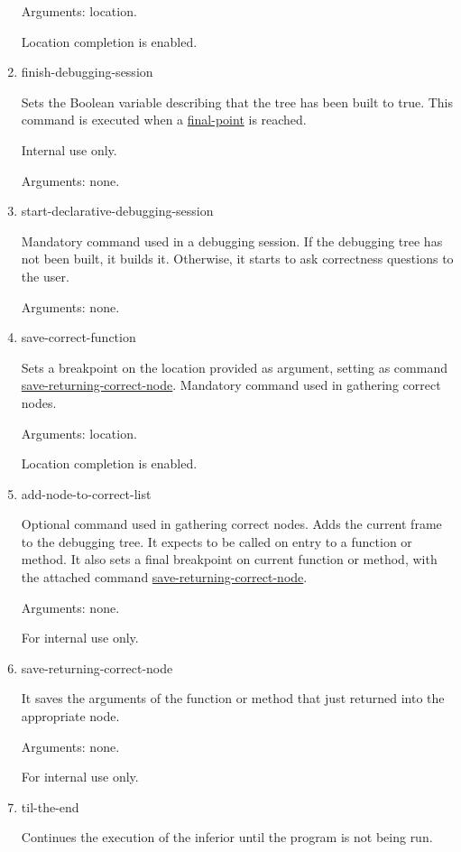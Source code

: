 \begin{enumerate}
Arguments: location.

Location completion is enabled.
\item finish-debugging-session
\label{command:finish-debugging-session}

Sets the Boolean variable describing that the tree has been built to true.
This command is executed when a \hyperref[command:final-point]{final-point} is reached.

Internal use only.

Arguments: none.
\item start-declarative-debugging-session
\label{command:start-declarative-debugging-session}

Mandatory command used in a debugging session.
If the debugging tree has not been built, it builds it. Otherwise, it starts to ask correctness questions to the user.

Arguments: none.
\item save-correct-function
\label{command:save-correct-function}

Sets a breakpoint on the location provided as argument, setting as command \hyperref[command:save-returning-correct-node]{save-returning-correct-node}. Mandatory command used in gathering correct nodes.

Arguments: location.

Location completion is enabled.
\item add-node-to-correct-list
\label{command:add-node-to-correct-list}

Optional command used in gathering correct nodes.
Adds the current frame to the debugging tree.
It expects to be called on entry to a function or method.
It also sets a final breakpoint on current function or method, with the attached command \hyperref[command:save-returning-correct-node]{save-returning-correct-node}.

Arguments: none.

For internal use only.
\item save-returning-correct-node
\label{command:save-returning-correct-node}

It saves the arguments of the function or method that just returned into the appropriate node.

Arguments: none.

For internal use only.
\item til-the-end
\label{command:til-the-end}

Continues the execution of the inferior until the program is not being run.


\end{enumerate}
